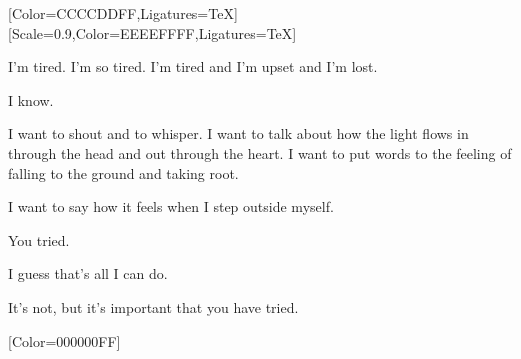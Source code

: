 \begin{paracol}{2}
  \begin{leftcolumn}

    [Color=CCCCDDFF,Ligatures=TeX]
    \renewfontfamily{}[Scale=0.9,Color=EEEEFFFF,Ligatures=TeX]
    \null

\noindent I'm tired. I'm so tired. I'm tired and I'm upset and I'm lost.

\begin{ally}
I know.
\end{ally}
\noindent I want to shout and to whisper. I want to talk about how the light flows in through the head and out through the heart. I want to put words to the feeling of falling to the ground and taking root.

I want to say how it feels when I step outside myself.

\begin{ally}
You tried.
\end{ally}
\noindent I guess that's all I can do.

\begin{ally}
It's not, but it's important that you have tried.
\end{ally}
\newpage
\end{leftcolumn}
\end{paracol}
\resetbackgroundcolor

\renewfontfamily{}[Color=000000FF]
